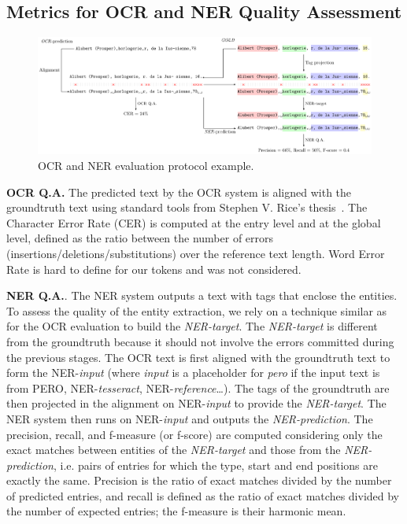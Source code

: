 \subsection{Metrics for OCR and NER Quality Assessment}

\begin{figure}[tb]
    \includegraphics[width=\linewidth]{figs/eval-ocr-ner.pdf}
    \caption{OCR and NER evaluation protocol example.}
    \label{fig.eval-ocr-ner}
\end{figure}

\textbf{OCR Q.A.}  The predicted text by the OCR system is aligned with the groundtruth text using standard tools from
Stephen V. Rice's thesis~\cite{santos.2019.wcmel,neudecker.2021.whdip}. The Character Error Rate (CER) is computed at
the entry level and at the global level, defined as the ratio between the number of errors
(insertions/deletions/substitutions) over the reference text length.
Word Error Rate is hard to define for our tokens and was not considered.



\textbf{NER Q.A.}. The NER system outputs a text with tags that enclose the entities. To assess the quality of the
entity extraction, we rely on a technique similar as for the OCR evaluation to build the \emph{NER-target}. The
\emph{NER-target} is different from the groundtruth because it should not involve the errors committed during the
previous stages. The OCR text is first aligned with the groundtruth text to form the NER-\emph{input} (where
\emph{input} is a placeholder for \emph{pero} if the input text is from PERO, NER-\emph{tesseract},
NER-\emph{reference}\ldots). The tags of the groundtruth are then projected in the alignment on NER-\emph{input} to
provide the \emph{NER-target}. The NER system then runs on NER-\emph{input} and outputs the \emph{NER-prediction}. The
precision, recall, and f-measure (or f-score) are computed considering only the exact matches between entities of the
\emph{NER-target} and those from the \emph{NER-prediction}, i.e. pairs of entries for which the type, start and end positions are exactly the same.
Precision is the ratio of exact matches divided by the number of predicted entries,
and recall is defined as the ratio of exact matches divided by the number of expected entries;
the f-measure is their harmonic mean.


